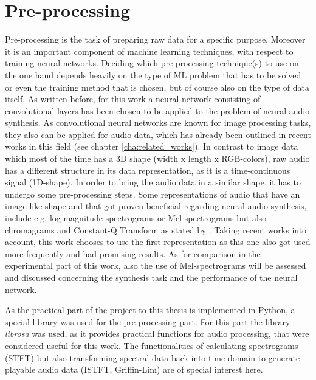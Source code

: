 \section{Pre-processing}
\label{sec:app_pre-processing}
Pre-processing is the task of preparing raw data for a specific purpose. Moreover it is an important component of machine learning techniques, with respect to training neural networks. Deciding which pre-processing technique(s) to use on the one hand depends heavily on the type of ML problem that has to be solved or even the training method that is chosen, but of course also on the type of data itself. As written before, for this work a neural network consisting of convolutional layers has been chosen to be applied to the problem of neural audio synthesis. As convolutional neural networks are known for image processing tasks, they also can be applied for audio data, which has already been outlined in recent works in this field (see chapter \ref{cha:related_works}). In contrast to image data which most of the time has a 3D shape (width x length x RGB-colors), raw audio has a different structure in its data representation, as it is a time-continuous signal (1D-shape). In order to bring the audio data in a similar shape, it has to undergo some pre-processing steps. Some representations of audio that have an image-like shape and that got proven beneficial regarding neural audio synthesis, include e.g. log-magnitude spectrograms or Mel-spectrograms but also chromagrams and Constant-Q Transform as stated by \cite{choi2018tutorial}. Taking recent works into account, this work chooses to use the first representation as this one also got used more frequently and had promising results. As for comparison in the experimental part of this work, also the use of Mel-spectrograms will be assessed and discussed concerning the synthesis task and the performance of the neural network. 

As the practical part of the project to this thesis is implemented in Python, a special library was used for the pre-processing part. For this part the library \textit{librosa} \cite{brian_mcfee_2022_6097378} was used, as it provides practical functions for audio processing, that were considered useful for this work. The functionalities of calculating spectrograms (STFT) but also transforming spectral data back into time domain to generate playable audio data (ISTFT, Griffin-Lim) are of special interest here.


